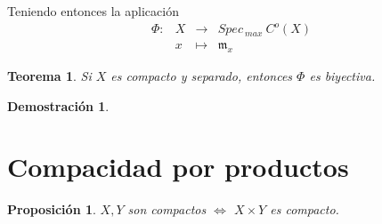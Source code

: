 \documentclass[12pt,twoside]{report}
\theoremstyle{azul}
\newtheorem*{demx}{Demostración}
\newtheorem*{teox}{Teorema}
\theoremstyle{azul2}
\theoremstyle{plain}
\newtheorem*{prop}{Proposición}
\theoremstyle{definition}
\theoremstyle{remark}
\begin{document}
Teniendo entonces la aplicación
$$\begin{array}{rrcl}
    \Phi: & X & \longrightarrow & Spec_{\: max} \: C^o(X)  \\
     & x & \longmapsto & \mathfrak{m}_x 
\end{array}$$
\begin{teox}
    Si $X$ es compacto y separado, entonces $\Phi$ es biyectiva.
\end{teox}
\begin{demx}
    
\end{demx}
\section{Compacidad por productos}
\begin{prop}
$X,Y$ son compactos $\Leftrightarrow$ $X \times Y$ es compacto.
\end{prop}
\end{document}
